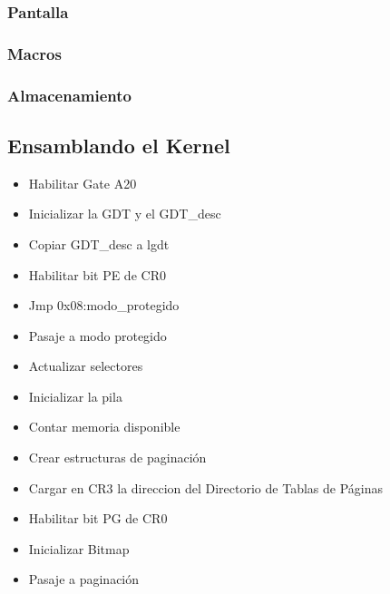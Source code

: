 \documentclass[11pt, a4paper]{article}
\begin{document}
		
     	\subsubsection{Pantalla}
		\subsubsection{Macros}
		\subsubsection{Almacenamiento}
	\subsection{Ensamblando el Kernel}
	\label{kernel}	
		\begin{itemize}
			\item Habilitar Gate A20
			\item Inicializar la GDT y el GDT\_desc
			\item Copiar GDT\_desc a lgdt
			\item Habilitar bit PE de CR0
			\item Jmp 0x08:modo\_protegido
			\item Pasaje a modo protegido
			\item Actualizar selectores
			\item Inicializar la pila
			\item Contar memoria disponible
			\item Crear estructuras de paginación
			\item Cargar en CR3 la direccion del Directorio de Tablas de Páginas
			\item Habilitar bit PG de CR0
			\item Inicializar Bitmap
			\item Pasaje a paginación
		\end{itemize}
	
\end{document}

